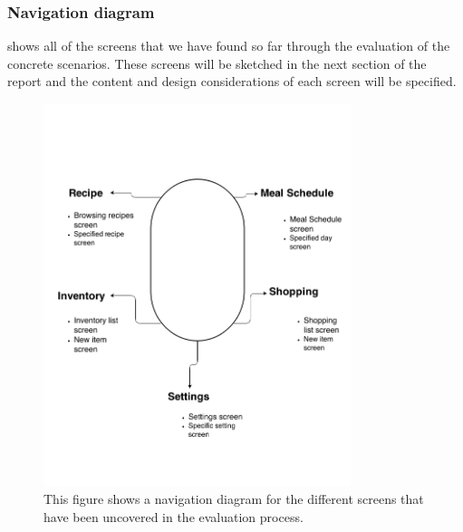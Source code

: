 \subsubsection{Navigation diagram}
 shows all of the screens that we have found so far through the evaluation of the concrete scenarios. These screens will be sketched in the next section of the report and the content and design considerations of each screen will be specified.  

\begin{figure}[H]
	\centering
	\includegraphics[width=0.8\textwidth, trim=0 3cm 0 5cm]{Grafik/FoodPlanner/NavigationsDiagram}
	\caption{This figure shows a navigation diagram for the different screens that have been uncovered in the evaluation process.}
	\label{NavigationDiagram}
\end{figure}
